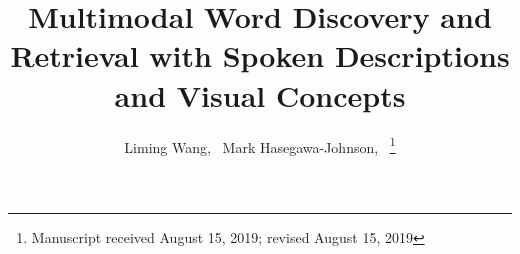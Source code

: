 \documentclass[journal]{IEEEtran}
\begin{document}
%
\title{Multimodal Word Discovery and Retrieval with Spoken Descriptions and Visual Concepts}
%
%
%

\author{Liming Wang,~
        Mark Hasegawa-Johnson,~
\thanks{Manuscript received August 15, 2019; revised August 15, 2019}}

% 
%
\end{document}
